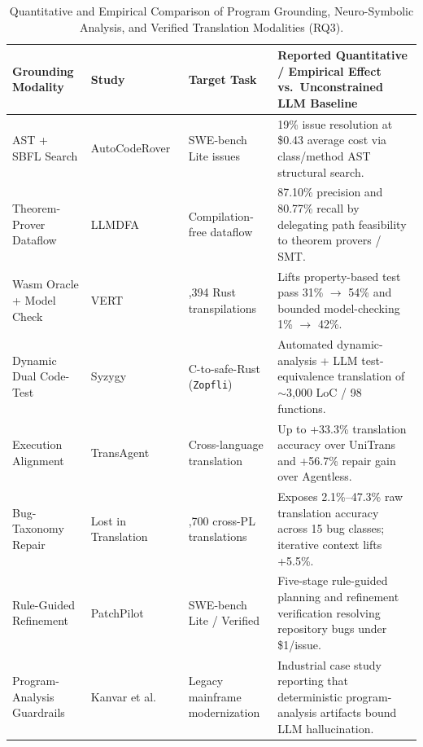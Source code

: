 \documentclass[10pt,twocolumn,a4paper]{article}
\begin{document}
\begin{table}[t!]
\centering
\caption{Quantitative and Empirical Comparison of Program Grounding, Neuro-Symbolic Analysis, and Verified Translation Modalities (RQ3).}
\label{tab:rq3_grounding}
\scriptsize
\setlength{\tabcolsep}{3.8pt}
\begin{tabularx}{\textwidth}{>{\raggedright\arraybackslash}p{2.60cm} >{\raggedright\arraybackslash}p{2.55cm} >{\raggedright\arraybackslash}p{2.50cm} X}
\toprule
\textbf{Grounding Modality} & \textbf{Study} & \textbf{Target Task} & \textbf{Reported Quantitative / Empirical Effect vs.\ Unconstrained LLM Baseline} \\
\midrule
AST + SBFL Search & AutoCodeRover~\cite{zhang2024autocoderover} & 300 SWE-bench Lite issues & 19\% issue resolution at \$0.43 average cost via class/method AST structural search. \\
Theorem-Prover Dataflow & LLMDFA~\cite{wang2024llmdfa} & Compilation-free dataflow & 87.10\% precision and 80.77\% recall by delegating path feasibility to theorem provers / SMT. \\
Wasm Oracle + Model Check & VERT~\cite{yang2024vert} & 1,394 Rust transpilations & Lifts property-based test pass 31\% $\rightarrow$ 54\% and bounded model-checking 1\% $\rightarrow$ 42\%. \\
Dynamic Dual Code-Test & Syzygy~\cite{shetty2025syzygy} & C-to-safe-Rust (\texttt{Zopfli}) & Automated dynamic-analysis + LLM test-equivalence translation of $\sim$3,000 LoC / 98 functions. \\
Execution Alignment & TransAgent~\cite{yuan2024transagent} & Cross-language translation & Up to +33.3\% translation accuracy over UniTrans and +56.7\% repair gain over Agentless. \\
Bug-Taxonomy Repair & Lost in Translation~\cite{pan2024lost} & 1,700 cross-PL translations & Exposes 2.1\%--47.3\% raw translation accuracy across 15 bug classes; iterative context lifts +5.5\%. \\
Rule-Guided Refinement & PatchPilot~\cite{li2025patchpilot} & SWE-bench Lite / Verified & Five-stage rule-guided planning and refinement verification resolving repository bugs under \$1/issue. \\
Program-Analysis Guardrails & Kanvar et al.~\cite{kanvar2026meets} & Legacy mainframe modernization & Industrial case study reporting that deterministic program-analysis artifacts bound LLM hallucination. \\
\bottomrule
\end{tabularx}
\end{table}
\end{document}
